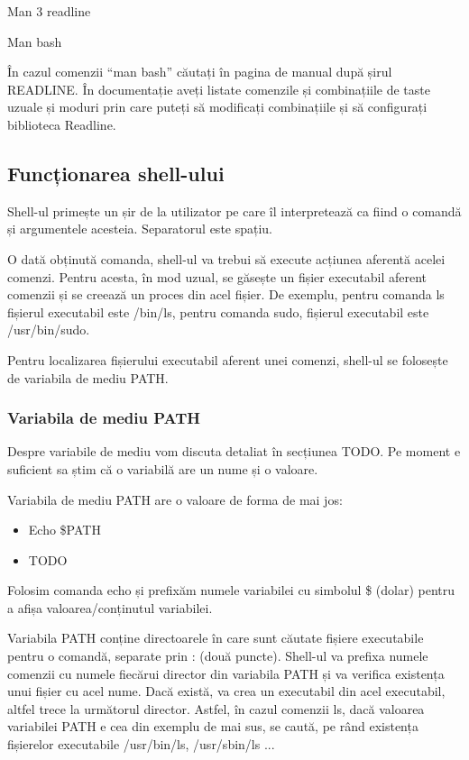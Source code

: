 Man 3 readline

Man bash

În cazul comenzii “man bash” căutați în pagina de manual după șirul READLINE. În
documentație aveți listate comenzile și combinațiile de taste uzuale și moduri
prin care puteți să modificați combinațiile și să configurați biblioteca
Readline.

\subsection{Funcționarea shell-ului}
\label{sec:cli-shell-func}

Shell-ul primește un șir de la utilizator pe care îl interpretează ca fiind o
comandă și argumentele acesteia. Separatorul este spațiu.

O dată obținută comanda, shell-ul va trebui să execute acțiunea aferentă acelei
comenzi. Pentru acesta, în mod uzual, se găsește un fișier executabil aferent
comenzii și se creează un proces din acel fișier. De exemplu, pentru comanda ls
fișierul executabil este /bin/ls, pentru comanda sudo, fișierul executabil este
/usr/bin/sudo.

Pentru localizarea fișierului executabil aferent unei comenzi, shell-ul se
folosește de variabila de mediu PATH.

\subsubsection{Variabila de mediu PATH}
\label{sec:cli-path}

Despre variabile de mediu vom discuta detaliat în secțiunea TODO. Pe moment e
suficient sa știm că o variabilă are un nume și o valoare.

Variabila de mediu PATH are o valoare de forma de mai jos:

\begin{itemize}
	\item Echo \$PATH
	\item TODO
\end{itemize}

Folosim comanda echo și prefixăm numele variabilei cu simbolul \$ (dolar) pentru
a afișa valoarea/conținutul variabilei.

Variabila PATH conține directoarele în care sunt căutate fișiere executabile
pentru o comandă, separate prin : (două puncte). Shell-ul va prefixa numele
comenzii cu numele fiecărui director din variabila PATH și va verifica existența
unui fișier cu acel nume. Dacă există, va crea un executabil din acel
executabil, altfel trece la următorul director. Astfel, în cazul comenzii ls,
dacă valoarea variabilei PATH e cea din exemplu de mai sus, se caută, pe rând
existența fișierelor executabile /usr/bin/ls, /usr/sbin/ls ...

